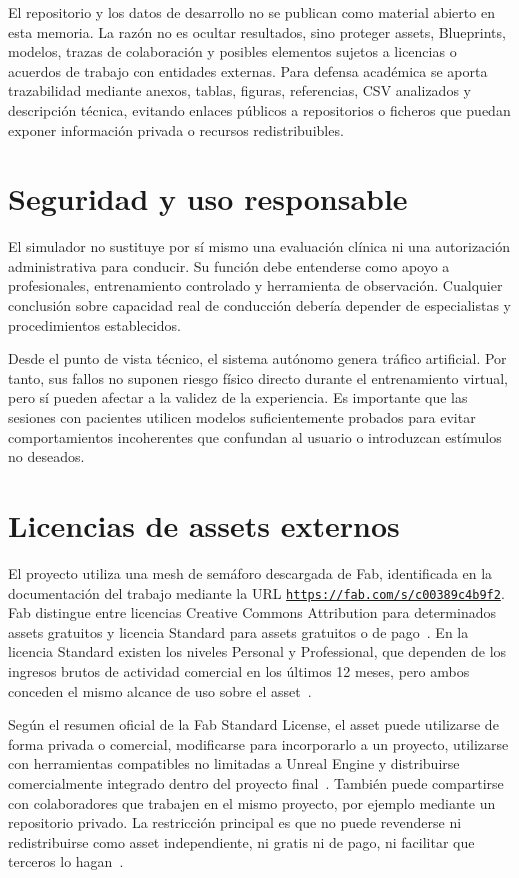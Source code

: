 El repositorio y los datos de desarrollo no se publican como material abierto en esta memoria. La razón no es ocultar resultados, sino proteger assets, Blueprints, modelos, trazas de colaboración y posibles elementos sujetos a licencias o acuerdos de trabajo con entidades externas. Para defensa académica se aporta trazabilidad mediante anexos, tablas, figuras, referencias, CSV analizados y descripción técnica, evitando enlaces públicos a repositorios o ficheros que puedan exponer información privada o recursos redistribuibles.

\section{Seguridad y uso responsable}

El simulador no sustituye por sí mismo una evaluación clínica ni una autorización administrativa para conducir. Su función debe entenderse como apoyo a profesionales, entrenamiento controlado y herramienta de observación. Cualquier conclusión sobre capacidad real de conducción debería depender de especialistas y procedimientos establecidos.

Desde el punto de vista técnico, el sistema autónomo genera tráfico artificial. Por tanto, sus fallos no suponen riesgo físico directo durante el entrenamiento virtual, pero sí pueden afectar a la validez de la experiencia. Es importante que las sesiones con pacientes utilicen modelos suficientemente probados para evitar comportamientos incoherentes que confundan al usuario o introduzcan estímulos no deseados.

\section{Licencias de assets externos}

El proyecto utiliza una mesh de semáforo descargada de Fab, identificada en la documentación del trabajo mediante la URL \href{https://fab.com/s/c00389c4b9f2}{\texttt{https://fab.com/s/c00389c4b9f2}}. Fab distingue entre licencias Creative Commons Attribution para determinados assets gratuitos y licencia Standard para assets gratuitos o de pago~\cite{fablicenses}. En la licencia Standard existen los niveles Personal y Professional, que dependen de los ingresos brutos de actividad comercial en los últimos 12 meses, pero ambos conceden el mismo alcance de uso sobre el asset~\cite{fabstandard}.

Según el resumen oficial de la Fab Standard License, el asset puede utilizarse de forma privada o comercial, modificarse para incorporarlo a un proyecto, utilizarse con herramientas compatibles no limitadas a Unreal Engine y distribuirse comercialmente integrado dentro del proyecto final~\cite{fabstandard}. También puede compartirse con colaboradores que trabajen en el mismo proyecto, por ejemplo mediante un repositorio privado. La restricción principal es que no puede revenderse ni redistribuirse como asset independiente, ni gratis ni de pago, ni facilitar que terceros lo hagan~\cite{fabstandard}.

